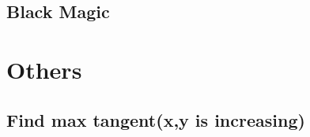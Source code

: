 \documentclass[a4paper,10pt,twocolumn,oneside]{article}
\begin{document}
%

%

\subsection{Black Magic}


\section{Others}

\subsection{Find max tangent(x,y is increasing)}


%

%
\end{document}
